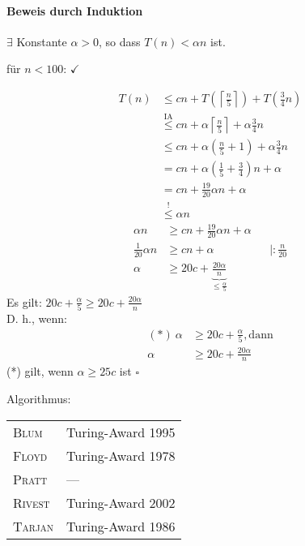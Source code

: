 \begin{description}
		\paragraph*{Beweis durch Induktion}
			\begin{description}
			 \item[Behauptung] $\exists$ Konstante $\alpha > 0$, so dass $T(n) < \alpha n$ ist.
			 \item für $n < 100$: $\checkmark$
			 \item[Induktionsschritt] 
				\begin{align*}
				 T(n) &\leq cn + T\left(\left\lceil\frac{n}{5}\right\rceil\right) + T\left(\frac{3}{4} n\right) \\
					  &\overset{\text{IA}}{\leq } cn + \alpha \left\lceil\frac{n}{5}\right\rceil + \alpha \frac{3}{4} n\\
					  &\leq cn + \alpha \left(\frac{n}{5} + 1\right) + \alpha \frac{3}{4} n \\
					  &= cn + \alpha \left(\frac{1}{5} +  \frac{3}{4}\right)n + \alpha \\
					  &= cn + \frac{19}{20} \alpha n + \alpha \\
					  &\overset{!}{\leq} \alpha n
				\end{align*}
				\begin{align*}
				 \alpha n &\geq cn + \frac{19}{20} \alpha n + \alpha\\
				 \frac{1}{20} \alpha n & \geq cn + \alpha &&| : \frac{n}{20} \\
				 \alpha & \geq 20c + \underbrace{\frac{20\alpha}{n}}_{\leq \frac{\alpha}{5}}
				\end{align*}
				Es gilt: $20 c + \frac{\alpha}{5} \geq 20c + \frac{20\alpha}{n}$ \\
				D. h., wenn:
					\begin{align*}
					(*)\ \alpha &\geq 20c + \frac{\alpha}{5}, \text{dann} \\
					\alpha &\geq 20c + \frac{20\alpha}{n}
					\end{align*}
					(*) gilt, wenn $\alpha \geq 25c$ ist \hfill$\square$
			\end{description}
		Algorithmus:
		\begin{center}
		 \begin{tabular}{ll}
			\textsc{Blum} & Turing-Award 1995 \\
			\textsc{Floyd} & Turing-Award 1978 \\
			\textsc{Pratt} & --- \\
			\textsc{Rivest} & Turing-Award 2002 \\
			\textsc{Tarjan} & Turing-Award 1986 
		 \end{tabular}
		\end{center}

\end{description}
